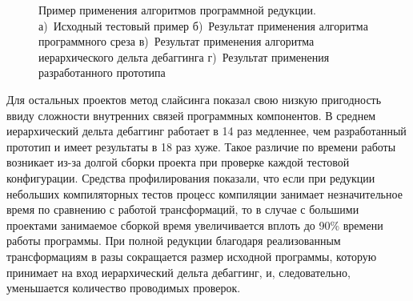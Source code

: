 \begin{figure}


\caption{\label{test:compare}Пример применения алгоритмов программной редукции. а)~Исходный тестовый пример б)~Результат применения алгоритма программного среза в)~Результат применения алгоритма иерархического дельта дебаггинга г)~Результат применения разработанного прототипа}
\end{figure}

Для остальных проектов метод слайсинга показал свою низкую пригодность ввиду сложности внутренних связей программных компонентов. В среднем иерархический дельта дебаггинг работает в 14 раз медленнее, чем разработанный прототип и имеет результаты в 18 раз хуже. Такое различие по времени работы возникает из-за долгой сборки проекта при проверке каждой тестовой конфигурации. Средства профилирования показали, что если при редукции небольших компиляторных тестов процесс компиляции занимает незначительное время по сравнению с работой трансформаций, то в случае с большими проектами занимаемое сборкой время увеличивается вплоть до 90\% времени работы программы. При полной редукции благодаря реализованным трансформациям в разы сокращается размер исходной программы, которую принимает на вход иерархический дельта дебаггинг, и, следовательно, уменьшается количество проводимых проверок. 

